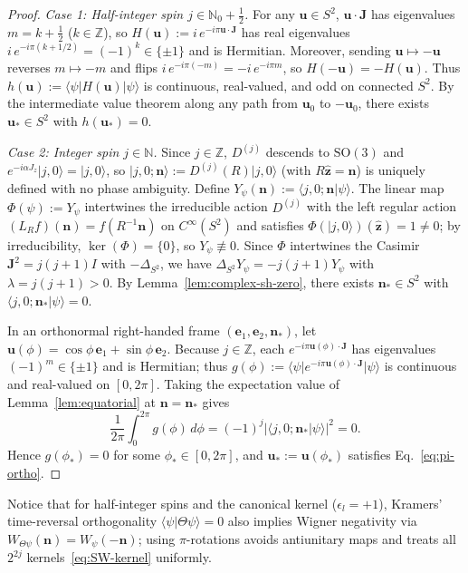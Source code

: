 \documentclass[aps,prl,reprint,amsmath,amssymb,nofootinbib,floatfix]{revtex4-2}
\newcommand{\ket}[1]{\lvert #1 \rangle}
\newcommand{\bra}[1]{\langle #1 \rvert}
\newcommand{\braket}[2]{\langle #1 \vert #2 \rangle}
\newcommand{\LapS}{\Delta_{S^2}}
\newcommand{\bn}{\mathbf{n}}
\newcommand{\bu}{\mathbf{u}}
\newcommand{\bJ}{\mathbf{J}}
\newcommand{\be}{\mathbf{e}}
\begin{document}
\begin{proof}
\emph{Case 1: Half-integer spin $j \in \mathbb{N}_0 + \frac{1}{2}$.} For any $\bu \in S^2$, $\bu\cdot\bJ$ has eigenvalues $m = k + \frac{1}{2}$ ($k \in \mathbb{Z}$), so $H(\bu) := i\,e^{-i\pi \bu\cdot\bJ}$ has real eigenvalues $i\,e^{-i\pi(k+1/2)} = (-1)^k \in \{\pm 1\}$ and is Hermitian. Moreover, sending $\bu \mapsto -\bu$ reverses $m \mapsto -m$ and flips $i\,e^{-i\pi(-m)} = -i\,e^{-i\pi m}$, so $H(-\bu) = -H(\bu)$. Thus $h(\bu) := \bra{\psi} H(\bu) \ket{\psi}$ is continuous, real-valued, and odd on connected $S^2$. By the intermediate value theorem along any path from $\bu_0$ to $-\bu_0$, there exists $\bu_* \in S^2$ with $h(\bu_*) = 0$.

\emph{Case 2: Integer spin $j \in \mathbb{N}$.} Since $j \in \mathbb{Z}$, $D^{(j)}$ descends to $\mathrm{SO}(3)$ and $e^{-i\alpha J_z}\ket{j,0} = \ket{j,0}$, so $\ket{j,0;\bn} := D^{(j)}(R)\ket{j,0}$ (with $R\hat{\mathbf{z}} = \bn$) is uniquely defined with no phase ambiguity. Define $Y_\psi(\bn) := \braket{j,0;\bn}{\psi}$. The linear map $\Phi(\psi) := Y_\psi$ intertwines the irreducible action $D^{(j)}$ with the left regular action $(L_R f)(\bn) = f(R^{-1}\bn)$ on $C^\infty(S^2)$ and satisfies $\Phi(\ket{j,0})(\hat{\mathbf{z}}) = 1 \neq 0$; by irreducibility, $\ker(\Phi) = \{0\}$, so $Y_\psi \not\equiv 0$. Since $\Phi$ intertwines the Casimir $\bJ^2 = j(j+1)I$ with $-\LapS$, we have $\LapS Y_\psi = -j(j+1)Y_\psi$ with $\lambda = j(j+1) > 0$. By Lemma~\ref{lem:complex-sh-zero}, there exists $\bn_* \in S^2$ with $\braket{j,0;\bn_*}{\psi} = 0$.

In an orthonormal right-handed frame $(\be_1, \be_2, \bn_*)$, let $\bu(\phi) = \cos\phi\,\be_1 + \sin\phi\,\be_2$. Because $j \in \mathbb{Z}$, each $e^{-i\pi\bu(\phi)\cdot\bJ}$ has eigenvalues $(-1)^m \in \{\pm 1\}$ and is Hermitian; thus $g(\phi) := \bra{\psi}e^{-i\pi\bu(\phi)\cdot\bJ}\ket{\psi}$ is continuous and real-valued on $[0, 2\pi]$. Taking the expectation value of Lemma~\ref{lem:equatorial} at $\bn = \bn_*$ gives
\begin{equation}
\frac{1}{2\pi}\int_{0}^{2\pi} g(\phi)\,d\phi = (-1)^j \big|\braket{j,0;\bn_*}{\psi}\big|^2 = 0.
\end{equation}
Hence $g(\phi_*) = 0$ for some $\phi_* \in [0, 2\pi]$, and $\bu_* := \bu(\phi_*)$ satisfies Eq.~\eqref{eq:pi-ortho}.
\end{proof}

Notice that for half-integer spins and the canonical kernel ($\epsilon_l = +1$), Kramers' time-reversal orthogonality $\braket{\psi}{\Theta\psi} = 0$ also implies Wigner negativity via $W_{\Theta\psi}(\bn) = W_\psi(-\bn)$; using $\pi$-rotations avoids antiunitary maps and treats all $2^{2j}$ kernels~\eqref{eq:SW-kernel} uniformly.
\end{document}
